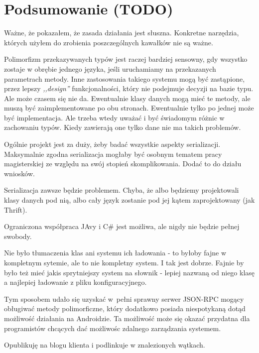 \chapter{Podsumowanie (TODO)}
Ważne, że pokazałem, że zasada działania jest słuszna. Konkretne narzędzia, których użyłem do zrobienia poszczególnych kawałków nie są ważne.

Polimorfizm przekazywanych typów jest raczej bardziej sensowny, gdy wszystko zostaje w obrębie jednego języka, jeśli uruchamiamy na przekazanych parametrach metody. Inne zastosowania takiego systemu mogą być zastąpione, przez lepszy \emph{,,design''} funkcjonalności, który nie podejmuje decyzji na bazie typu. Ale może czasem się nie da. Ewentualnie klasy danych mogą mieć te metody, ale muszą być zaimplementowane po obu stronach. Ewentualnie tylko po jednej może być implementacja. Ale trzeba wtedy uważać i być świadomym różnic w zachowaniu typów. Kiedy zawierają one tylko dane nie ma takich problemów.

Ogólnie projekt jest za duży, żeby badać wszystkie aspekty serializacji. Maksymalnie zgodna serializacja mogłaby być osobnym tematem pracy magisterskiej ze względu na swój stopień skomplikowania.
Dodać to do działu wniosków.

Serializacja zawsze będzie problemem. Chyba, że albo będziemy projektowali klasy danych pod nią, albo cały język zostanie pod jej kątem zaprojektowany (jak Thrift).

Ograniczona współpraca JAvy i C\# jest możliwa, ale nigdy nie będzie pełnej swobody.

Nie było tłumaczenia klas ani systemu ich ładowania - to byłoby fajne w kompletnym sytemie, ale to nie kompletny system. I tak jest dobrze. Fajnie by było też mieć jakis sprytniejszy system na słownik - lepiej nazwaną od niego klasę a najlepiej ładowanie z pliku konfiguracyjnego.

Tym sposobem udało się uzyskać w~pełni sprawny serwer JSON-RPC mogący obługiwać metody polimorficzne, który dodatkowo posiada niespotykaną dotąd możliwość działania na Androidzie.
Ta możliwość może się okazać przydatna dla programistów chcących dać możliwośc zdalnego zarządzania systemem.

Opublikuję na blogu klienta i podlinkuje w znalezionych wątkach.

